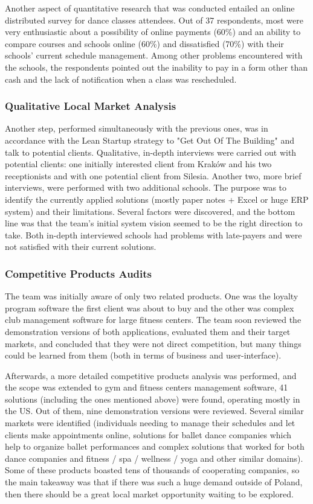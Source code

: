 \documentclass{article}
\begin{document}
Another aspect of quantitative research that was conducted entailed an online distributed survey for dance classes attendees. Out of 37 respondents, most were very enthusiastic about a possibility of online payments (60\%) and an ability to compare courses and schools online (60\%) and dissatisfied (70\%) with their schools' current schedule management. Among other problems encountered with the schools, the respondents pointed out the inability to pay in a form other than cash and the lack of notification when a class was rescheduled.

\subsubsection{Qualitative Local Market Analysis}
Another step, performed simultaneously with the previous ones, was in accordance with the Lean Startup strategy to "Get Out Of The Building" and talk to potential clients. Qualitative, in-depth interviews were carried out with potential clients: one initially interested client from Kraków and his two receptionists and with one potential client from Silesia. Another two, more brief interviews, were performed with two additional schools. The purpose was to identify the currently applied solutions (mostly paper notes + Excel or huge ERP system) and their limitations. Several factors were discovered, and the bottom line was that the team's initial system vision seemed to be the right direction to take. Both in-depth interviewed schools had problems with late-payers and were not satisfied with their current solutions.

\subsubsection{Competitive Products Audits}
The team was initially aware of only two related products. One was the loyalty program software the first client was about to buy and the other was complex club management software for large fitness centers. The team soon reviewed the demonstration versions of both applications, evaluated them and their target markets, and concluded that they were not direct competition, but many things could be learned from them (both in terms of business and user-interface).

Afterwards, a more detailed competitive products analysis was performed, and the scope was extended to gym and fitness centers management software, 41 solutions (including the ones mentioned above) were found, operating mostly in the US. Out of them, nine demonstration versions were reviewed. Several similar markets were identified (individuals needing to manage their schedules and let clients make appointments online, solutions for ballet dance companies which help to organize ballet performances and complex solutions that worked for both dance companies and fitness / spa / wellness / yoga and other similar domains). Some of these products boasted tens of thousands of cooperating companies, so the main takeaway was that if there was such a huge demand outside of Poland, then there should be a great local market opportunity waiting to be explored.
\end{document}
